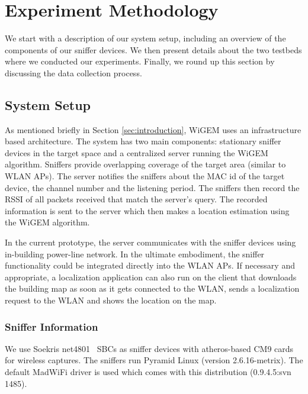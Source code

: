 \section{Experiment Methodology}
\label{sec:experimentmethodology}

We start with a description of our system setup, including an overview of the components of our sniffer devices. We then present details about the two testbeds where we conducted our experiments. Finally, we round up this section by discussing the data collection process.

\subsection{System Setup}
\label{subsec:systemsetup}

As mentioned briefly in Section \ref{sec:introduction}, WiGEM uses an infrastructure based
architecture. The system has two main components: stationary sniffer devices in the target space and a centralized server running the WiGEM algorithm. Sniffers provide overlapping coverage of the target area (similar to WLAN APs). The server notifies the sniffers about the MAC id of the target device, the channel number and the listening period. The sniffers then record the RSSI of all packets received that match the server's query. The recorded information is sent to the server which then makes a location estimation using the WiGEM algorithm.

In the current prototype, the server communicates with the sniffer devices using in-building power-line network. In the ultimate embodiment, the sniffer functionality could be integrated directly into the WLAN APs. If necessary and appropriate, a localization application can also run on the client that downloads the building map as soon as it gets connected to the WLAN, sends a localization request to the WLAN and shows the location on the map. 

\subsubsection{Sniffer Information}
\label{subsec:snifferinformation}


We use Soekris net4801~\cite{soekris}  SBCs as sniffer
devices with atheros-based CM9 cards for wireless captures. The sniffers run Pyramid Linux (version 2.6.16-metrix). The default
MadWiFi driver is used which comes with this distribution (0.9.4.5:svn 1485). 

